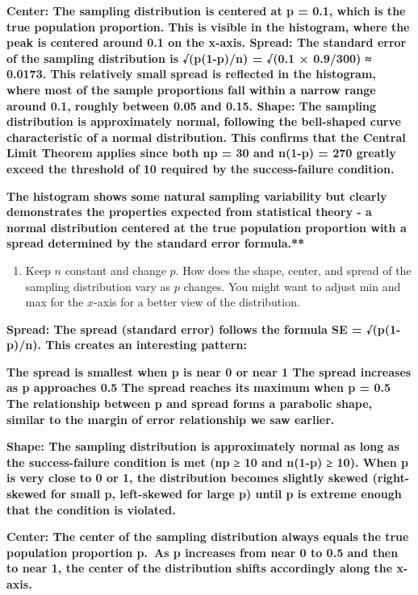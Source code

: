 \documentclass[
]{article}
\providecommand{\tightlist}{%
  \setlength{\itemsep}{0pt}\setlength{\parskip}{0pt}}
\begin{document}
\textbf{Center: The sampling distribution is centered at p = 0.1, which
is the true population proportion. This is visible in the histogram,
where the peak is centered around 0.1 on the x-axis. Spread: The
standard error of the sampling distribution is √(p(1-p)/n) = √(0.1 ×
0.9/300) ≈ 0.0173. This relatively small spread is reflected in the
histogram, where most of the sample proportions fall within a narrow
range around 0.1, roughly between 0.05 and 0.15. Shape: The sampling
distribution is approximately normal, following the bell-shaped curve
characteristic of a normal distribution. This confirms that the Central
Limit Theorem applies since both np = 30 and n(1-p) = 270 greatly exceed
the threshold of 10 required by the success-failure condition.}

\textbf{The histogram shows some natural sampling variability but
clearly demonstrates the properties expected from statistical theory - a
normal distribution centered at the true population proportion with a
spread determined by the standard error formula.**}

\begin{enumerate}
\def\labelenumi{\arabic{enumi}.}
\setcounter{enumi}{6}
\tightlist
\item
  Keep \(n\) constant and change \(p\). How does the shape, center, and
  spread of the sampling distribution vary as \(p\) changes. You might
  want to adjust min and max for the \(x\)-axis for a better view of the
  distribution.
\end{enumerate}

\textbf{Spread: The spread (standard error) follows the formula SE =
√(p(1-p)/n). This creates an interesting pattern:}

\textbf{The spread is smallest when p is near 0 or near 1 The spread
increases as p approaches 0.5 The spread reaches its maximum when p =
0.5 The relationship between p and spread forms a parabolic shape,
similar to the margin of error relationship we saw earlier.}

\textbf{Shape: The sampling distribution is approximately normal as long
as the success-failure condition is met (np ≥ 10 and n(1-p) ≥ 10). When
p is very close to 0 or 1, the distribution becomes slightly skewed
(right-skewed for small p, left-skewed for large p) until p is extreme
enough that the condition is violated.}

\textbf{Center: The center of the sampling distribution always equals
the true population proportion p.~As p increases from near 0 to 0.5 and
then to near 1, the center of the distribution shifts accordingly along
the x-axis.}
\end{document}
